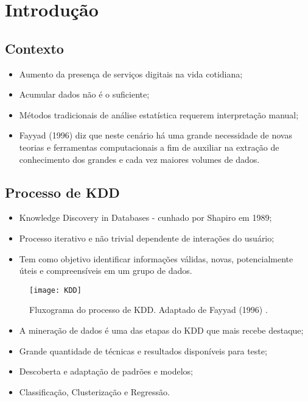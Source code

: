 \section{Introdução}

\subsection{Contexto}
\begin{frame}
	\begin{itemize}
		\item Aumento da presença de serviços digitais na vida cotidiana;
		\item Acumular dados não é o suficiente;
		\item Métodos tradicionais de análise estatística requerem interpretação manual;
		\item Fayyad (1996) \cite{fayyad1996} diz que neste cenário há uma grande necessidade de novas teorias e ferramentas computacionais a fim de auxiliar na extração de conhecimento dos grandes e cada vez maiores volumes de dados.
	\end{itemize}
\end{frame}

\subsection{Processo de KDD}

\begin{frame}
	\begin{itemize}
		\item Knowledge Discovery in Databases - cunhado por Shapiro em 1989;
		\item Processo iterativo e não trivial dependente de interações do usuário;
		\item Tem como objetivo identificar informações válidas, novas, potencialmente úteis e compreensíveis em um grupo de dados.
	\end{itemize}
\end{frame}

\begin{frame}
	\begin{figure}[h!]
		\texttt{[image: KDD]}
		\caption{Fluxograma do processo de KDD. Adaptado de Fayyad (1996) \cite{fayyad1996}.}
	\end{figure}
\end{frame}

\begin{frame}
	\begin{itemize}
		\item A mineração de dados é uma das etapas do KDD que mais recebe destaque;
		\item Grande quantidade de técnicas e resultados disponíveis para teste;
		\item Descoberta e adaptação de padrões e modelos;
		\item Classificação, Clusterização e Regressão.
	\end{itemize}
\end{frame}
